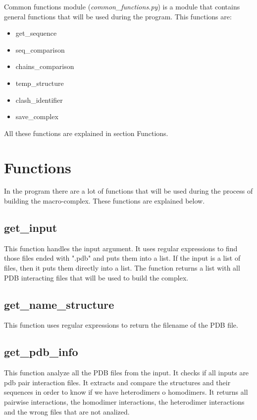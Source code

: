 \documentclass[a4paper,10pt]{report}
\begin{document}
Common functions module (\textit{common\_functions.py}) is a module that contains general functions that will be used during the program. This functions are:

\begin{itemize}
 \item get\_sequence
 \item seq\_comparison
 \item chains\_comparison
 \item temp\_structure
 \item clash\_identifier
 \item save\_complex
\end{itemize}

\noindent
All these functions are explained in section Functions.

\section{Functions}

In the program there are a lot of functions that will be used during the process of building the macro-complex. These functions are explained below.

\subsection{get\_input}

This function handles the input argument. It uses regular expressions to find those files ended with ".pdb" and puts them into a list. If the input is a list of files, then it puts them directly into a list. The function returns a list with all PDB interacting files that will be used to build the complex.

\subsection{get\_name\_structure}

This function uses regular expressions to return the filename of the PDB file.

\subsection{get\_pdb\_info}

This function analyze all the PDB files from the input. It checks if all inputs are pdb pair interaction files. It extracts and compare the structures and their sequences in order to know if we have heterodimers o homodimers. It returns all pairwise interactions, the homodimer interactions, the heterodimer interactions and the wrong files that are not analized.
\end{document}
